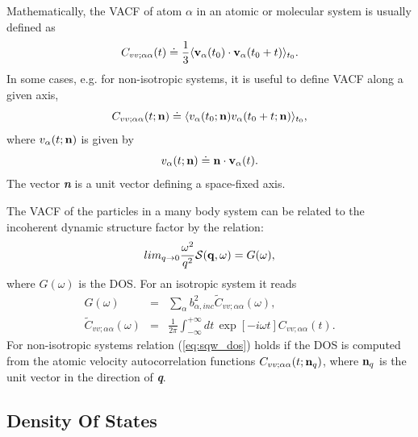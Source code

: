 \documentclass[a4paper,11pt]{article}
\begin{document}
Mathematically, the \gls{VACF} of atom $\alpha$ in an atomic or molecular system is usually defined as
\begin{equation}
\label{eq:vacf}
C_{vv ; \alpha\alpha}(t) \doteq
\frac{1}{3}\langle {\bf v}_\alpha(t_0)\cdot{\bf v}_\alpha(t_0+t)\rangle_{t_0}.
\end{equation}
In some cases, e.g. for non-isotropic systems, it is useful to define \gls{VACF} along a given axis,
\begin{equation}
\label{eq:vacf_n}
C_{vv ; \alpha\alpha}(t;{\bf n}) \doteq
\langle v_\alpha(t_0;{\bf n})v_\alpha(t_0+t;{\bf n})\rangle_{t_0},
\end{equation}
where $v_\alpha(t;{\bf n})$ is given by
\begin{equation}
v_\alpha(t;{\bf n}) \doteq 
{\bf n}\cdot{\bf v}_{\alpha}(t).
\end{equation}
The vector \textit{\textbf{n}} is a unit vector defining a space-fixed axis.

The \gls{VACF} of the particles in a many body system can be related to the
incoherent dynamic structure factor by the relation:
\begin{equation}
\label{eq:sqw_dos}
lim_{q\to 0} \frac{\omega^2}{q^2}{\cal S}({\bf q},\omega) =
G(\omega), 
\end{equation}
where $G(\omega)$ is the \gls{DOS}. For an isotropic system it reads
\begin{eqnarray}
\label{eq:dos}
G(\omega) &= &\sum_{\alpha}b^2_{\alpha,inc}
\tilde C_{vv ; \alpha\alpha}(\omega),\\
\label{eq:dos_alpha}
\tilde C_{vv ; \alpha\alpha}(\omega) &= &
\frac{1}{2\pi}\int_{-\infty}^{+\infty}dt\, \exp[-i\omega t] 
C_{vv ; \alpha\alpha}(t).
\end{eqnarray}
For non-isotropic systems relation (\ref{eq:sqw_dos}) holds if the \gls{DOS} is computed from the atomic velocity 
autocorrelation functions $C_{vv ; \alpha\alpha}(t;{\bf n}_q)$, where ${\bf n}_q$ is the unit vector in the 
direction of \textit{\textbf{q}}.

\subsection{Density Of States}
\label{dos}
\end{document}
